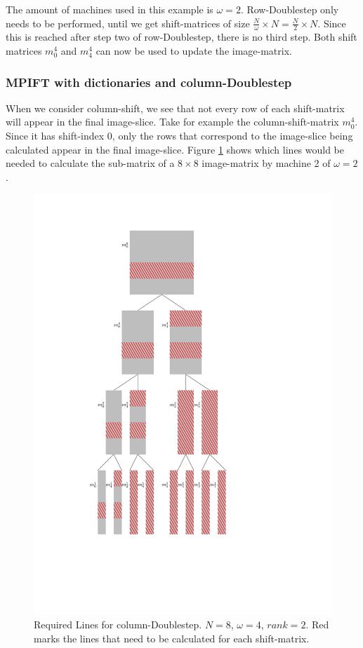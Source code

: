 \documentclass[12pt]{article}
\begin{document}
The amount of machines used in this example is $\omega=2$. Row-Doublestep only needs to be performed, until we get shift-matrices of size $\frac{N}{\omega}\times N=\frac{N}{2}\times N$. Since this is reached after step two of row-Doublestep, there is no third step. Both shift matrices $m_0^4$ and $m_4^4$ can now be used to update the image-matrix.

\subsubsection{MPIFT with dictionaries and column-Doublestep}
\label{sec::perpendicDoublestep}

When we consider column-shift, we see that not every row of each shift-matrix will appear in the final image-slice. Take for example the column-shift-matrix $m_{0}^4$. Since it has shift-index $0$, only the rows that correspond to the image-slice being calculated appear in the final image-slice. Figure \ref{fig::recursiveLines} shows which lines would be needed to calculate the sub-matrix of a $8\times 8$ image-matrix by machine 2 of $\omega=2$.

\begin{figure}[ht!]
	\begin{center}
	\includegraphics[height=\textheight-3cm]{Recursive_lines}
	\caption{Required Lines for column-Doublestep. $N=8$, $\omega = 4$, $rank=2$. Red marks the lines that need to be calculated for each shift-matrix.}
	\label{fig::recursiveLines}
\end{center}
\end{figure}
\end{document}

